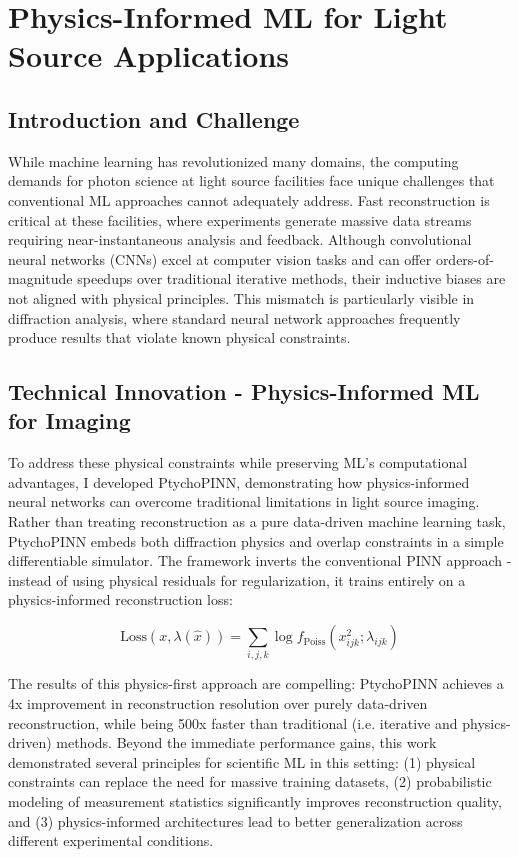 \documentclass{article}
\begin{document}
\section{Physics-Informed ML for Light Source Applications}
\subsection{Introduction and Challenge}
While machine learning has revolutionized many domains, the computing demands for photon science at light source facilities face unique challenges that conventional ML approaches cannot adequately address. Fast reconstruction is critical at these facilities, where experiments generate massive data streams requiring near-instantaneous analysis and feedback. Although convolutional neural networks (CNNs) excel at computer vision tasks and can offer orders-of-magnitude speedups over traditional iterative methods, their inductive biases are not aligned with physical principles. This mismatch is particularly visible in diffraction analysis, where standard neural network approaches frequently produce results that violate known physical constraints.

\subsection{Technical Innovation - Physics-Informed ML for Imaging}
To address these physical constraints while preserving ML's computational advantages, I developed PtychoPINN, demonstrating how physics-informed neural networks can overcome traditional limitations in light source imaging. Rather than treating reconstruction as a pure data-driven machine learning task, PtychoPINN embeds both diffraction physics and overlap constraints in a simple differentiable simulator. The framework inverts the conventional PINN approach - instead of using physical residuals for regularization, it trains entirely on a physics-informed reconstruction loss:

\begin{equation}
\text{Loss}(x, \lambda(\hat{x})) = \sum_{i,j,k} \log f_{\text{Poiss}}(x_{ijk}^2; \lambda_{ijk})
\end{equation}


The results of this physics-first approach are compelling: PtychoPINN achieves a 4x improvement in reconstruction resolution over purely data-driven reconstruction, while being 500x faster than traditional (i.e. iterative and physics-driven) methods. Beyond the immediate performance gains, this work demonstrated several principles for scientific ML in this setting: (1) physical constraints can replace the need for massive training datasets, (2) probabilistic modeling of measurement statistics significantly improves reconstruction quality, and (3) physics-informed architectures lead to better generalization across different experimental conditions.
\end{document}
